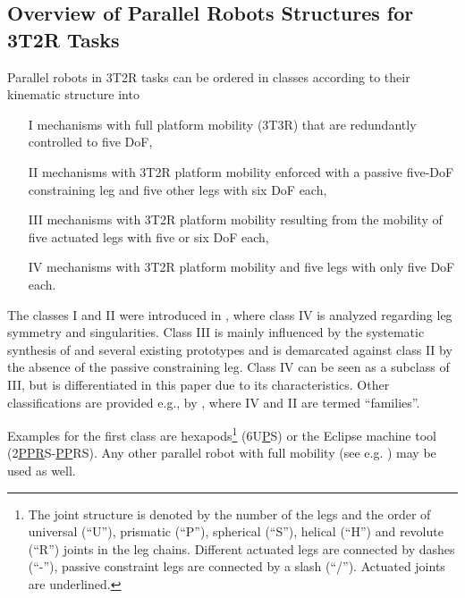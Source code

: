 \documentclass[robotics,article,accept,moreauthors,pdftex]{Definitions/mdpi}
\begin{document}
\subsection{Overview of Parallel Robots Structures for 3T2R Tasks}
\label{sec:parrob_classification}

Parallel robots in 3T2R tasks can be ordered in classes according to their kinematic structure into
\begin{itemize}
	\item[I] mechanisms with full platform mobility (3T3R) that are redundantly controlled to five DoF,
	\item[II] mechanisms with 3T2R platform mobility enforced with a passive five-DoF constraining leg and five other legs with six DoF each,
	\item[III] mechanisms with 3T2R platform mobility resulting from the mobility of five actuated legs with five or six DoF each,
	\item[IV] mechanisms with 3T2R platform mobility and five legs with only five DoF each.
\end{itemize}

The classes I and II were introduced in \cite{Tale-MasoulehGos2011}, where class IV is analyzed regarding leg symmetry and singularities.
Class III is mainly influenced by the systematic synthesis of \cite{Gogu2008} and several existing prototypes and is demarcated against class II by the absence of the passive constraining leg.
Class IV can be seen as a subclass of III, but is differentiated in this paper due to its characteristics.
Other classifications are provided e.g., by \cite{HuangLiuChe2011}, where IV and II are termed ``families''.

Examples for the first class are hexapods\footnote{The joint structure is denoted by the number of the legs and the order of universal (``U''), prismatic (``P''), spherical (``S''), helical (``H'') and revolute (``R'') joints in the leg chains. Different actuated legs are connected by dashes (``-''), passive constraint legs are connected by a slash (``/''). Actuated joints are underlined.} (6U\underline{P}S) \cite{MerletPerDan2000} or the Eclipse \cite{HongKim2000} machine tool (2\underline{PPR}S-\underline{PP}RS).
Any other parallel robot with full mobility (see e.g. \cite{Merlet2006,Gogu2008,Zhang2009}) may be used as well.
\end{document}
